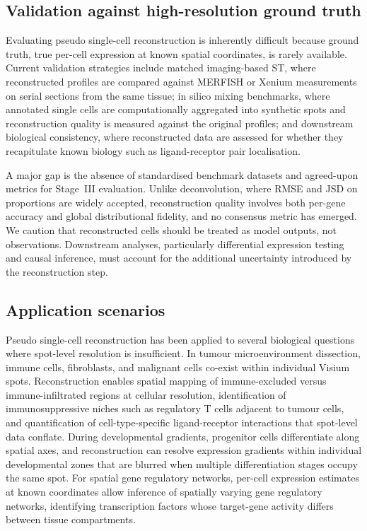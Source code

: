 \subsection{Validation against high-resolution ground truth}

Evaluating pseudo single-cell reconstruction is inherently difficult because ground truth, true per-cell expression at known spatial coordinates, is rarely available. Current validation strategies include matched imaging-based ST, where reconstructed profiles are compared against MERFISH or Xenium measurements on serial sections from the same tissue; in silico mixing benchmarks, where annotated single cells are computationally aggregated into synthetic spots and reconstruction quality is measured against the original profiles; and downstream biological consistency, where reconstructed data are assessed for whether they recapitulate known biology such as ligand-receptor pair localisation.

A major gap is the absence of standardised benchmark datasets and agreed-upon metrics for Stage~III evaluation. Unlike deconvolution, where RMSE and JSD on proportions are widely accepted, reconstruction quality involves both per-gene accuracy and global distributional fidelity, and no consensus metric has emerged. We caution that reconstructed cells should be treated as model outputs, not observations. Downstream analyses, particularly differential expression testing and causal inference, must account for the additional uncertainty introduced by the reconstruction step.

\subsection{Application scenarios}

Pseudo single-cell reconstruction has been applied to several biological questions where spot-level resolution is insufficient. In tumour microenvironment dissection, immune cells, fibroblasts, and malignant cells co-exist within individual Visium spots. Reconstruction enables spatial mapping of immune-excluded versus immune-infiltrated regions at cellular resolution, identification of immunosuppressive niches such as regulatory T cells adjacent to tumour cells, and quantification of cell-type-specific ligand-receptor interactions that spot-level data conflate. During developmental gradients, progenitor cells differentiate along spatial axes, and reconstruction can resolve expression gradients within individual developmental zones that are blurred when multiple differentiation stages occupy the same spot. For spatial gene regulatory networks, per-cell expression estimates at known coordinates allow inference of spatially varying gene regulatory networks, identifying transcription factors whose target-gene activity differs between tissue compartments.
